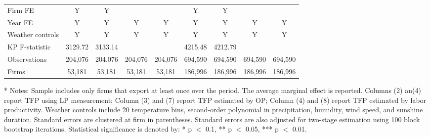 \documentclass[12pt]{article}
\begin{document}
\begin{table}[H]
{\begin{tabular}{l*{8}{c}}
    \hline
    Firm FE              &Y&Y& & &Y&Y & & \\
    Year FE              &Y&Y&Y&Y&Y&Y&Y&Y\\
    Weather controls     &Y&Y&Y&Y&Y&Y&Y&Y\\
    KP F-statistic       &3129.72&3133.14&&&4215.48&4212.79&&\\
    Observations         &204,076&204,076&204,076 &204,076  &694,590  &694,590 &694,590&694,590\\
    Firms                &53,181 &53,181 &53,181  &53,181   &186,996	&186,996 &186,996&186,996 \\
    \hline\hline
  \end{tabular}
  }
  \begin{tablenotes}
    \item[*] \small Notes: Sample includes only firms that export at least once over the period. The average marginal effect is reported. Columns (2) an(4) report TFP using LP measurement;
    Column (3) and (7) report TFP estimated by OP; Column (4) and (8) report TFP estimated by labor productivity. Weather controls include 20 temperature bins, second-order polynomial in precipitation, humidity, wind speed, and sunshine duration. Standard errors are clustered at firm in parentheses. Standard errors are also adjusted for two-stage estimation using 100 block bootstrap iterations. Statistical significance is denoted by: * p $<$ 0.1, ** p $<$ 0.05, *** p $<$ 0.01.
  \end{tablenotes}
\end{table}
\end{document}
